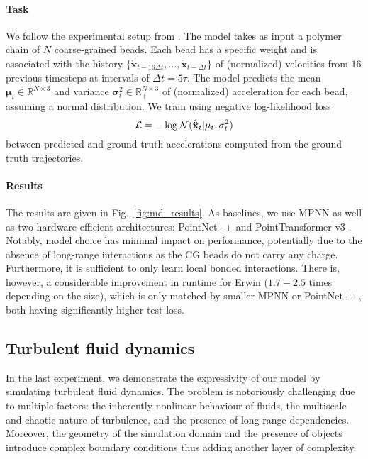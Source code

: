 \vspace{-5pt}
\paragraph{Task}
We follow the experimental setup from \citet{Fu2022SimulateTC}. The model takes as input a polymer chain of $N$ coarse-grained beads. Each bead has a specific weight and is associated with the history $\{\dot{\mathbf{x}}_{t - 16\Delta t}, ..., \dot{\mathbf{x}}_{t - \Delta t} \}$ of (normalized) velocities from $16$ previous timesteps at intervals of $\Delta t = 5 \tau$. The model predicts the mean $\mathbf{\mu}_t \in \mathbb{R}^{N \times 3}$ and variance $\mathbf{\sigma}_t^2 \in \mathbb{R}_+^{N \times 3}$ of (normalized) acceleration for each bead, assuming a normal distribution. We train using negative log-likelihood loss
\vspace{-2pt}
\begin{equation*}
    \mathcal{L} = -\log \mathcal{N}(\hat{\ddot{\mathbf{x}}}_t|\mathbf{\mu}_t, \mathbf{\sigma}_t^2)
\vspace{-2pt}
\end{equation*}
between predicted and ground truth accelerations computed from the ground truth trajectories.




\vspace{-5pt}
\paragraph{Results}
The results are given in Fig.~\ref{fig:md_results}. As baselines, we use MPNN \cite{gilmer2017neuralmessagepassingquantum} as well as two hardware-efficient architectures: PointNet++ \cite{Qi2017PointNetDH} and PointTransformer v3 \cite{Wu2023PointTV}. Notably, model choice has minimal impact on performance, potentially due to the absence of long-range interactions as the CG beads do not carry any charge. Furthermore, it is sufficient to only learn local bonded interactions. There is, however, a considerable improvement in runtime for Erwin ($1.7-2.5$ times depending on the size), which is only matched by smaller MPNN or PointNet++, both having significantly higher test loss. 




\subsection{Turbulent fluid dynamics}
In the last experiment, we demonstrate the expressivity of our model by simulating turbulent fluid dynamics. The problem is notoriously challenging due to multiple factors: the inherently nonlinear behaviour of fluids, the multiscale and chaotic nature of turbulence, and the presence of long-range dependencies. Moreover, the geometry of the simulation domain and the presence of objects introduce complex boundary conditions thus adding another layer of complexity.

